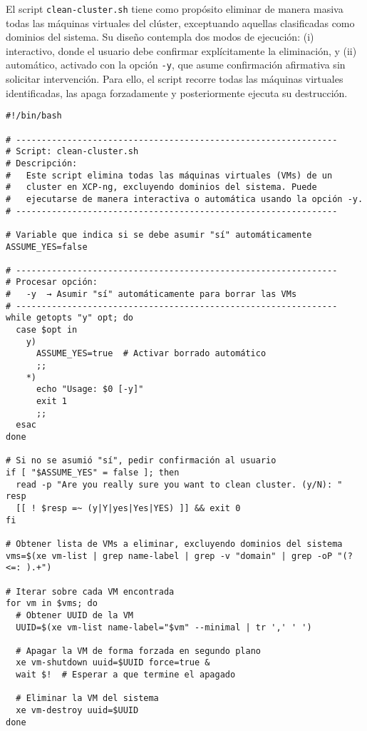 El script \texttt{clean-cluster.sh} tiene como propósito eliminar de manera masiva todas las máquinas virtuales del clúster, exceptuando aquellas clasificadas como dominios del sistema. Su diseño contempla dos modos de ejecución: (i) interactivo, donde el usuario debe confirmar explícitamente la eliminación, y (ii) automático, activado con la opción \texttt{-y}, que asume confirmación afirmativa sin solicitar intervención. Para ello, el script recorre todas las máquinas virtuales identificadas, las apaga forzadamente y posteriormente ejecuta su destrucción.
\begin{verbatim}
#!/bin/bash

# ---------------------------------------------------------------
# Script: clean-cluster.sh
# Descripción:
#   Este script elimina todas las máquinas virtuales (VMs) de un 
#   cluster en XCP-ng, excluyendo dominios del sistema. Puede 
#   ejecutarse de manera interactiva o automática usando la opción -y.
# ---------------------------------------------------------------

# Variable que indica si se debe asumir "sí" automáticamente
ASSUME_YES=false

# ---------------------------------------------------------------
# Procesar opción:
#   -y  → Asumir "sí" automáticamente para borrar las VMs
# ---------------------------------------------------------------
while getopts "y" opt; do
  case $opt in
    y)
      ASSUME_YES=true  # Activar borrado automático
      ;;
    *)
      echo "Usage: $0 [-y]"
      exit 1
      ;;
  esac
done

# Si no se asumió "sí", pedir confirmación al usuario
if [ "$ASSUME_YES" = false ]; then
  read -p "Are you really sure you want to clean cluster. (y/N): " resp
  [[ ! $resp =~ (y|Y|yes|Yes|YES) ]] && exit 0
fi

# Obtener lista de VMs a eliminar, excluyendo dominios del sistema
vms=$(xe vm-list | grep name-label | grep -v "domain" | grep -oP "(?<=: ).+")

# Iterar sobre cada VM encontrada
for vm in $vms; do
  # Obtener UUID de la VM
  UUID=$(xe vm-list name-label="$vm" --minimal | tr ',' ' ')
  
  # Apagar la VM de forma forzada en segundo plano
  xe vm-shutdown uuid=$UUID force=true &
  wait $!  # Esperar a que termine el apagado
  
  # Eliminar la VM del sistema
  xe vm-destroy uuid=$UUID
done
\end{verbatim}